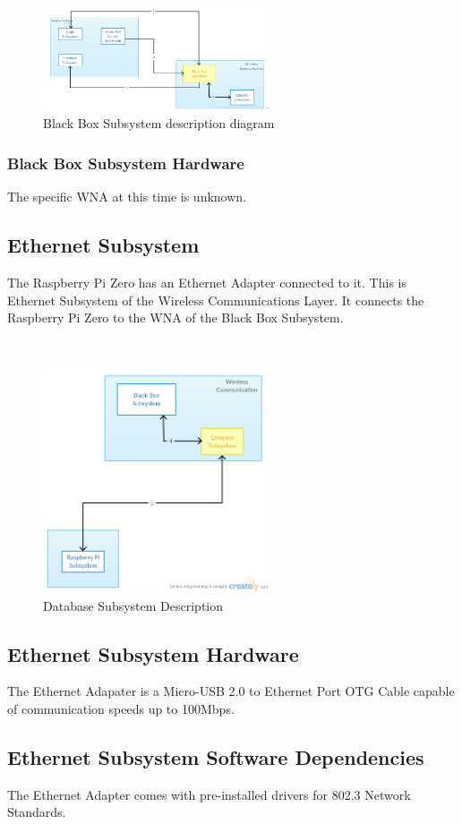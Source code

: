 \begin{figure}[h!]
	\centering
 	\includegraphics[width=0.60\textwidth]{architectural design specification latex/images/ADSdiagrams/blackboxsubsystem.png}
 \caption{Black Box Subsystem description diagram}
\end{figure}

\subsubsection{Black Box Subsystem Hardware}
The specific WNA at this time is unknown.

\subsection{Ethernet Subsystem}
The Raspberry Pi Zero has an Ethernet Adapter connected to it. This is Ethernet Subsystem of the Wireless Communications Layer. It connects the Raspberry Pi Zero to the WNA of the Black Box Subsystem.

\begin{figure}[h!] 
 	\centering 
  	\includegraphics[width=0.60\textwidth]{architectural design specification latex/images/ADSdiagrams/ethernetsubsystem.png} 
 \caption{Database Subsystem Description} 
\end{figure}

\subsection{Ethernet Subsystem Hardware}
The Ethernet Adapater is a Micro-USB 2.0 to Ethernet Port OTG Cable capable of communication speeds up to 100Mbps.

\subsection{Ethernet Subsystem Software Dependencies}
The Ethernet Adapter comes with pre-installed drivers for 802.3 Network Standards.
